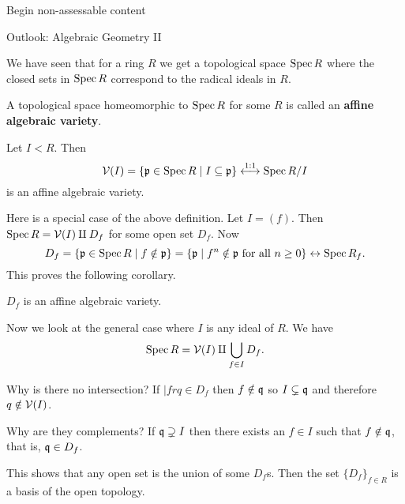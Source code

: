 Begin non-assessable content

Outlook: Algebraic Geometry II

We have seen that for a ring $R$ we get a topological space $\operatorname{Spec} R$ where the closed sets in $\operatorname{Spec} R$ correspond to the radical ideals in $R$.

\begin{defn}[AG.4]
  A topological space homeomorphic to $\operatorname{Spec} R$ for some $R$ is called an \textbf{affine algebraic variety}.
\end{defn}

Let $I<R$.
Then
\[\mathcal{V}(I) = \{ \mathfrak{p} \in \operatorname{Spec} R \mid I \subseteq \mathfrak{p} \} \overset{1:1}{\longleftrightarrow} \operatorname{Spec} R/I\]
is an affine algebraic variety.

Here is a special case of the above definition.
Let $I = (f)$.
Then $\operatorname{Spec} R = \mathcal{V}(I) \amalg D_f$ for some open set $D_f$.
Now
\[D_f = \{\mathfrak{p} \in \operatorname{Spec} R \mid f \notin \mathfrak{p} \} = \{ \mathfrak{p} \mid f^n \notin \mathfrak{p} \text{ for all } n \geq 0\} \leftrightarrow \operatorname{Spec} R_f.\]
This proves the following corollary.

\begin{cor}
  $D_f$ is an affine algebraic variety.
\end{cor}

Now we look at the general case where $I$ is any ideal of $R$.
We have
\[ \operatorname{Spec} R = \mathcal{V}(I) \amalg \bigcup_{f \in I} D_f.\]
\begin{enum}
  \io
  Why is there no intersection?
  If $|fr q \in D_f$ then $f \notin \mathfrak{q}$ so $I \subsetneq \mathfrak{q}$ and therefore $q \notin \mathcal{V}(I)$.

  \io
  Why are they complements?
  If $\mathfrak{q} \supsetneq I$ then there exists an $f \in I$ such that $f \notin \mathfrak{q}$, that is, $\mathfrak{q} \in D_f$.
\end{enum}

This shows that any open set is the union of some $D_f$s.
Then the set $\{D_f\}_{f\in R}$ is a basis of the open topology.
